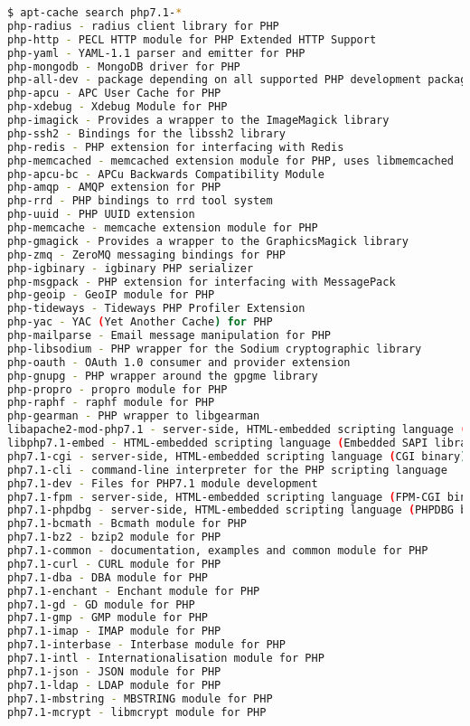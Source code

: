 \begin{lstlisting}[language=bash]
$ apt-cache search php7.1-*
php-radius - radius client library for PHP
php-http - PECL HTTP module for PHP Extended HTTP Support
php-yaml - YAML-1.1 parser and emitter for PHP
php-mongodb - MongoDB driver for PHP
php-all-dev - package depending on all supported PHP development packages
php-apcu - APC User Cache for PHP
php-xdebug - Xdebug Module for PHP
php-imagick - Provides a wrapper to the ImageMagick library
php-ssh2 - Bindings for the libssh2 library
php-redis - PHP extension for interfacing with Redis
php-memcached - memcached extension module for PHP, uses libmemcached
php-apcu-bc - APCu Backwards Compatibility Module
php-amqp - AMQP extension for PHP
php-rrd - PHP bindings to rrd tool system
php-uuid - PHP UUID extension
php-memcache - memcache extension module for PHP
php-gmagick - Provides a wrapper to the GraphicsMagick library
php-zmq - ZeroMQ messaging bindings for PHP
php-igbinary - igbinary PHP serializer
php-msgpack - PHP extension for interfacing with MessagePack
php-geoip - GeoIP module for PHP
php-tideways - Tideways PHP Profiler Extension
php-yac - YAC (Yet Another Cache) for PHP
php-mailparse - Email message manipulation for PHP
php-libsodium - PHP wrapper for the Sodium cryptographic library
php-oauth - OAuth 1.0 consumer and provider extension
php-gnupg - PHP wrapper around the gpgme library
php-propro - propro module for PHP
php-raphf - raphf module for PHP
php-gearman - PHP wrapper to libgearman
libapache2-mod-php7.1 - server-side, HTML-embedded scripting language (Apache 2 module)
libphp7.1-embed - HTML-embedded scripting language (Embedded SAPI library)
php7.1-cgi - server-side, HTML-embedded scripting language (CGI binary)
php7.1-cli - command-line interpreter for the PHP scripting language
php7.1-dev - Files for PHP7.1 module development
php7.1-fpm - server-side, HTML-embedded scripting language (FPM-CGI binary)
php7.1-phpdbg - server-side, HTML-embedded scripting language (PHPDBG binary)
php7.1-bcmath - Bcmath module for PHP
php7.1-bz2 - bzip2 module for PHP
php7.1-common - documentation, examples and common module for PHP
php7.1-curl - CURL module for PHP
php7.1-dba - DBA module for PHP
php7.1-enchant - Enchant module for PHP
php7.1-gd - GD module for PHP
php7.1-gmp - GMP module for PHP
php7.1-imap - IMAP module for PHP
php7.1-interbase - Interbase module for PHP
php7.1-intl - Internationalisation module for PHP
php7.1-json - JSON module for PHP
php7.1-ldap - LDAP module for PHP
php7.1-mbstring - MBSTRING module for PHP
php7.1-mcrypt - libmcrypt module for PHP

\end{lstlisting}
